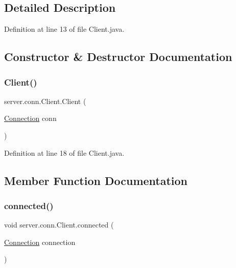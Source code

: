 \subsection{Detailed Description}


Definition at line 13 of file Client.\+java.



\subsection{Constructor \& Destructor Documentation}
\hypertarget{classserver_1_1conn_1_1_client_a5097d176d58d7de8d559d175065ceabf}{}\label{classserver_1_1conn_1_1_client_a5097d176d58d7de8d559d175065ceabf} 
\subsubsection{\texorpdfstring{Client()}{Client()}}
{\footnotesize\ttfamily server.\+conn.\+Client.\+Client (\begin{DoxyParamCaption}\item[{\hyperlink{classsharedlib_1_1conn_1_1_connection}{Connection}}]{conn }\end{DoxyParamCaption})}



Definition at line 18 of file Client.\+java.



\subsection{Member Function Documentation}
\hypertarget{classserver_1_1conn_1_1_client_a9c86594158e4eb8e09159567dd94f6ce}{}\label{classserver_1_1conn_1_1_client_a9c86594158e4eb8e09159567dd94f6ce} 
\subsubsection{\texorpdfstring{connected()}{connected()}}
{\footnotesize\ttfamily void server.\+conn.\+Client.\+connected (\begin{DoxyParamCaption}\item[{\hyperlink{classsharedlib_1_1conn_1_1_connection}{Connection}}]{connection }\end{DoxyParamCaption})}

